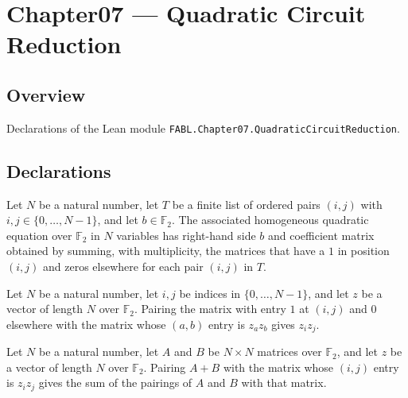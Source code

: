 \chapter{Chapter07 — Quadratic Circuit Reduction}
\section{Overview}

Declarations of the Lean module \texttt{FABL.Chapter07.QuadraticCircuitReduction}.

\section{Declarations}

\begin{definition}
\label{FABL.homogeneousQuadraticEquationOfTerms}
\leanok
{}
Let $N$ be a natural number, let $T$ be a finite list of ordered pairs $(i,j)$ with
$i,j\in\{0,\ldots,N-1\}$, and let $b\in\mathbb{F}_2$. The associated homogeneous
quadratic equation over $\mathbb{F}_2$ in $N$ variables has right-hand side $b$ and
coefficient matrix obtained by summing, with multiplicity, the matrices that have a $1$
in position $(i,j)$ and zeros elsewhere for each pair $(i,j)$ in $T$.
\end{definition}

\begin{theorem}
\label{FABL.binaryMatrixPairing_single}
\leanok
{}
Let $N$ be a natural number, let $i,j$ be indices in $\{0,\ldots,N-1\}$, and let $z$ be
a vector of length $N$ over $\mathbb{F}_2$. Pairing the matrix with entry $1$ at $(i,j)$
and $0$ elsewhere with the matrix whose $(a,b)$ entry is $z_a z_b$ gives $z_i z_j$.
\end{theorem}

\begin{theorem}
\label{FABL.binaryMatrixPairing_add_left}
\leanok
{}
Let $N$ be a natural number, let $A$ and $B$ be $N\times N$ matrices over
$\mathbb{F}_2$, and let $z$ be a vector of length $N$ over $\mathbb{F}_2$. Pairing $A+B$
with the matrix whose $(i,j)$ entry is $z_i z_j$ gives the sum of the pairings of $A$
and $B$ with that matrix.
\end{theorem}

